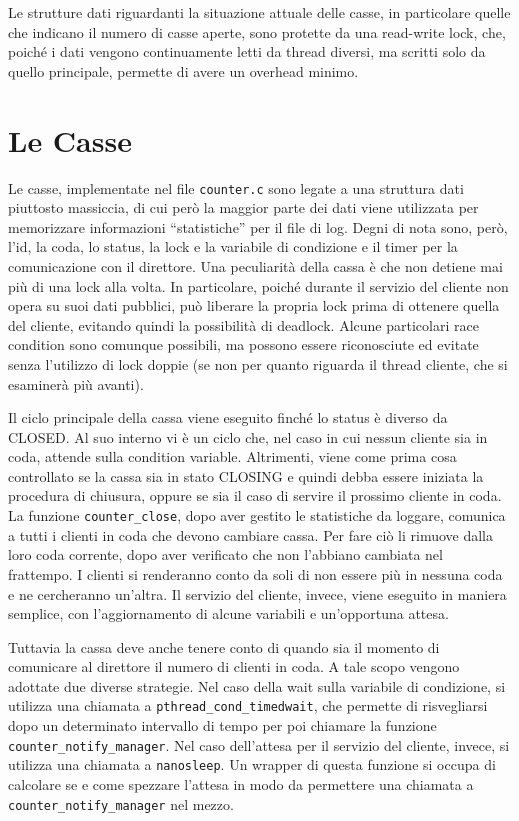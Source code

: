 \documentclass[a4paper,11pt,twoside] {article}
\begin{document}
Le strutture dati riguardanti la situazione attuale delle casse, in particolare quelle che indicano il numero di casse aperte, sono protette da una read-write lock, che, poiché i dati vengono continuamente letti da thread diversi, ma scritti solo da quello principale, permette di avere un overhead minimo.

\section*{Le Casse}

Le casse, implementate nel file \lstinline{counter.c} sono legate a una struttura dati piuttosto massiccia, di cui però la maggior parte dei dati viene utilizzata per memorizzare informazioni ``statistiche'' per il file di log. Degni di nota sono, però, l'id, la coda, lo status, la lock e la variabile di condizione e il timer per la comunicazione con il direttore. Una peculiarità della cassa è che non detiene mai più di una lock alla volta. In particolare, poiché durante il servizio del cliente non opera su suoi dati pubblici, può liberare la propria lock prima di ottenere quella del cliente, evitando quindi la possibilità di deadlock. Alcune particolari race condition sono comunque possibili, ma possono essere riconosciute ed evitate senza l'utilizzo di lock doppie (se non per quanto riguarda il thread cliente, che si esaminerà più avanti).

Il ciclo principale della cassa viene eseguito finché lo status è diverso da CLOSED. Al suo interno vi è un ciclo che, nel caso in cui nessun cliente sia in coda, attende sulla condition variable. Altrimenti, viene come prima cosa controllato se la cassa sia in stato CLOSING e quindi debba essere iniziata la procedura di chiusura, oppure se sia il caso di servire il prossimo cliente in coda. La funzione \lstinline{counter_close}, dopo aver gestito le statistiche da loggare, comunica a tutti i clienti in coda che devono cambiare cassa. Per fare ciò li rimuove dalla loro coda corrente, dopo aver verificato che non l'abbiano cambiata nel frattempo. I clienti si renderanno conto da soli di non essere più in nessuna coda e ne cercheranno un'altra. Il servizio del cliente, invece, viene eseguito in maniera semplice, con l'aggiornamento di alcune variabili e un'opportuna attesa.

Tuttavia la cassa deve anche tenere conto di quando sia il momento di comunicare al direttore il numero di clienti in coda. A tale scopo vengono adottate due diverse strategie. Nel caso della wait sulla variabile di condizione, si utilizza una chiamata a \lstinline{pthread_cond_timedwait}, che permette di risvegliarsi dopo un determinato intervallo di tempo per poi chiamare la funzione \lstinline{counter_notify_manager}. Nel caso dell'attesa per il servizio del cliente, invece, si utilizza una chiamata a \lstinline{nanosleep}. Un wrapper di questa funzione si occupa di calcolare se e come spezzare l'attesa in modo da permettere una chiamata a \lstinline{counter_notify_manager} nel mezzo.
\end{document}
